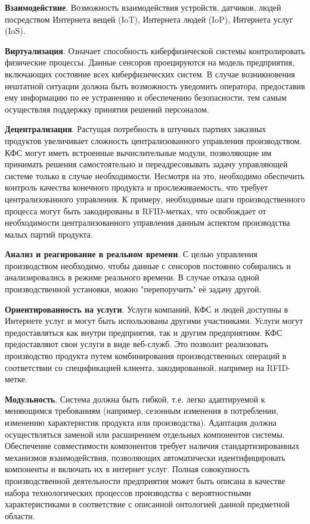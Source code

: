\begin{textitemize}
\item \textbf{Взаимодействие}. Возможность взаимодействия устройств, датчиков, людей посредством Интернета вещей (IoT), Интернета людей (IoP), Интернета услуг (IoS).
\item \textbf{Виртуализация}. Означает способность киберфизической системы контролировать физические процессы. Данные сенсоров проецируются на модель предприятия, включающих состояние всех киберфизических систем. В случае возникновения нештатной ситуации должна быть возможность уведомить оператора, предоставив ему информацию по ее устранению и обеспечению безопасности, тем самым осуществляя поддержку принятия решений персоналом.
\item \textbf{Децентрализация}. Растущая потребность в штучных партиях заказных продуктов увеличивает сложность централизованного управления производством. КФС могут иметь встроенные вычислительные модули, позволяющие им принимать решения самостоятельно и переадресовывать задачу управляющей системе только в случае необходимости. Несмотря на это, необходимо обеспечить контроль качества конечного продукта и прослеживаемость, что требует централизованного управления. К примеру, необходимые шаги производственного процесса могут быть закодированы в RFID-метках, что освобождает от необходимости централизованного управления данным аспектом производства малых партий продукта.
\item \textbf{Анализ и реагирование в реальном времени}. С целью управления производством необходимо, чтобы данные с сенсоров постоянно собирались и анализировались в режиме реального времени. В случае отказа одной производственной установки, можно "перепоручить" её задачу другой.
\item \textbf{Ориентированность на услуги}. Услуги компаний, КФС и людей доступны в Интернете услуг и могут быть использованы другими участниками. Услуги могут предоставляться как внутри предприятия, так и другим предприятиям. КФС предоставляют свои услуги в виде веб-служб. Это позволит реализовать производство продукта путем комбинирования производственных операций в соответствии со спецификацией клиента, закодированной, например на RFID-метке.
\item \textbf{Модульность}. Система должна быть гибкой, т.е. легко адаптируемой к меняющимся требованиям (например, сезонным изменения в потреблении, изменению характеристик продукта или производства). Адаптация должна осуществляться заменой или расширением отдельных компонентов системы. Обеспечение совместимости компонентов требует наличия стандартизированных механизмов взаимодействия, позволяющих автоматически идентифицировать компоненты и включать их в интернет услуг.
Полная совокупность производственной деятельности предприятия может быть описана в качестве набора технологических процессов производства с вероятностными характеристиками в соответствие с описанной онтологией данной предметной области.
\end{textitemize}

